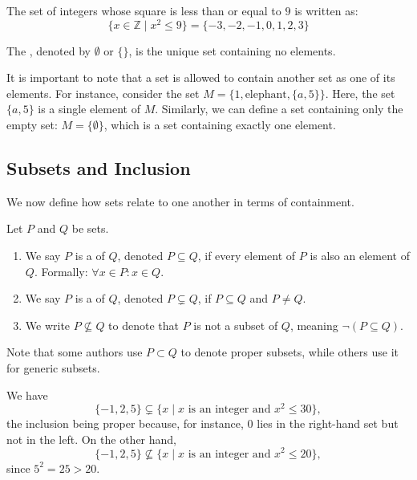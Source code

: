\begin{example}
The set of integers whose square is less than or equal to $9$ is written as:
\[
\{x \in \mathbb{Z} \mid x^2 \le 9\} = \{-3, -2, -1, 0, 1, 2, 3\}
\]
\end{example}

\begin{definition}
\label{def:empty_set}
The , denoted by $\emptyset$ or $\{\}$, is the unique set containing no elements.
\end{definition}

It is important to note that a set is allowed to contain another set as one of its elements. For instance, consider the set $M = \{1, \text{elephant}, \{a, 5\}\}$. Here, the set $\{a, 5\}$ is a single element of $M$. Similarly, we can define a set containing only the empty set: $M = \{\emptyset\}$, which is a set containing exactly one element.

\subsection{Subsets and Inclusion}

We now define how sets relate to one another in terms of containment.

\begin{definition}
\label{def:subset}
Let $P$ and $Q$ be sets.
\begin{enumerate}
    \item We say $P$ is a  of $Q$, denoted $P \subseteq Q$, if every element of $P$ is also an element of $Q$. Formally: $\forall x \in P : x \in Q$.
    \item We say $P$ is a  of $Q$, denoted $P \subsetneq Q$, if $P \subseteq Q$ and $P \ne Q$. 
    \item We write $P \not\subseteq Q$ to denote that $P$ is not a subset of $Q$, meaning $\neg(P \subseteq Q)$.
\end{enumerate}
\end{definition}

\begin{remark}
Note that some authors use $P \subset Q$ to denote proper subsets, while others use it for generic subsets.
\end{remark}

\begin{example}
\label{ex:subset_examples}
We have
\[
\{-1, 2, 5\} \subsetneq \{x \mid x \text{ is an integer and } x^2 \le 30\},
\]
the inclusion being proper because, for instance, $0$ lies in the right-hand set but not in the left. On the other hand,
\[
\{-1, 2, 5\} \not\subseteq \{x \mid x \text{ is an integer and } x^2 \le 20\},
\]
since $5^2 = 25 > 20$.
\end{example}

